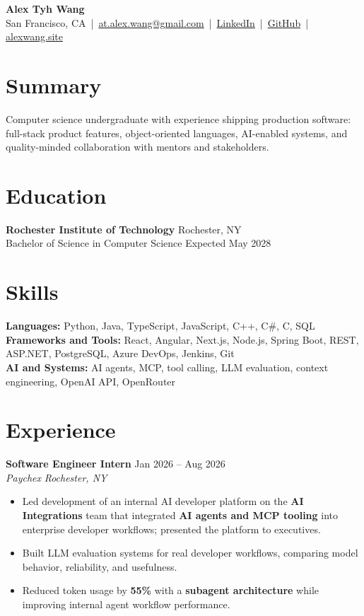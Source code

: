 \documentclass[10pt,letterpaper]{article}
\newif\ifresumeFirstRole
\newcommand{\resumeRole}[4]{%
  \ifresumeFirstRole
    \global\resumeFirstRolefalse
  \else
    \vspace{0pt plus 1fill}%
  \fi
  \textbf{#1} \hfill #2\\
  \textit{#3} \hfill \textit{#4}
}
\begin{document}
\begin{center}
{\Large \textbf{Alex Tyh Wang}}\\
San Francisco, CA \,|\, \href{mailto:at.alex.wang@gmail.com}{at.alex.wang@gmail.com} \,|\, \href{https://www.linkedin.com/in/alex-tyh-wang/}{LinkedIn} \,|\, \href{https://github.com/alextyhwang}{GitHub} \,|\, \href{https://alexwang.site}{alexwang.site}
\end{center}

\section*{Summary}
Computer science undergraduate with experience shipping production software: full-stack product features, object-oriented languages, AI-enabled systems, and quality-minded collaboration with mentors and stakeholders.

\section*{Education}
\textbf{Rochester Institute of Technology} \hfill Rochester, NY\\
Bachelor of Science in Computer Science \hfill Expected May 2028

\section*{Skills}
\textbf{Languages:} Python, Java, TypeScript, JavaScript, C++, C\#, C, SQL\\
\textbf{Frameworks and Tools:} React, Angular, Next.js, Node.js, Spring Boot, REST, ASP.NET, PostgreSQL, Azure DevOps, Jenkins, Git\\
\textbf{AI and Systems:} AI agents, MCP, tool calling, LLM evaluation, context engineering, OpenAI API, OpenRouter

\section*{Experience}
\resumeRole{Software Engineer Intern}{Jan 2026 -- Aug 2026}{Paychex}{Rochester, NY}
\begin{itemize}
  \item Led development of an internal AI developer platform on the \textbf{AI Integrations} team that integrated \textbf{AI agents and MCP tooling} into enterprise developer workflows; presented the platform to executives.
  \item Built LLM evaluation systems for real developer workflows, comparing model behavior, reliability, and usefulness.
  \item Reduced token usage by \textbf{55\%} with a \textbf{subagent architecture} while improving internal agent workflow performance.
\end{itemize}
\end{document}

